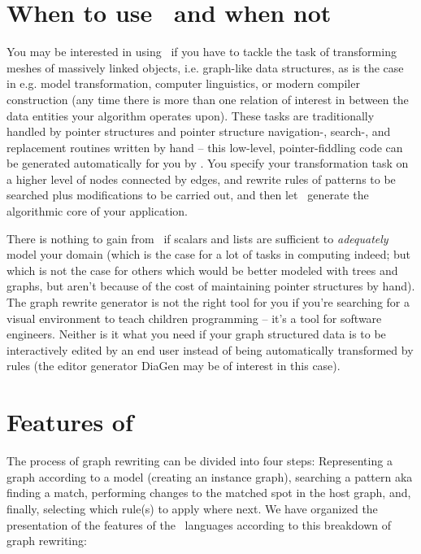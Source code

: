 \section{When to use \GrG~and when not}
You may be interested in using \GrG\ if you have to tackle the task of transforming meshes of massively linked objects, i.e. graph-like data structures,
as is the case in e.g. model transformation, computer linguistics, or modern compiler construction 
(any time there is more than one relation of interest in between the data entities your algorithm operates upon).
These tasks are traditionally handled by pointer structures and pointer structure navigation-, search-, and replacement routines written by hand
-- this low-level, pointer-fiddling code can be generated automatically for you by \GrG.
You specify your transformation task on a higher level of nodes connected by edges, and rewrite rules of patterns to be searched plus modifications to be carried out,
and then let \GrG\ generate the algorithmic core of your application.

There is nothing to gain from \GrG\ if scalars and lists are sufficient to \emph{adequately} model your domain 
(which is the case for a lot of tasks in computing indeed; 
but which is not the case for others which would be better modeled with trees and graphs, but aren't because of the cost of maintaining pointer structures by hand).
The graph rewrite generator is not the right tool for you if you're searching for a visual environment to teach children programming -- it's a tool for software engineers.
Neither is it what you need if your graph structured data is to be interactively edited by an end user instead of being automatically transformed by rules (the editor generator DiaGen\cite{diagen} may be of interest in this case).


\section{Features of \GrG}

The process of graph rewriting can be divided into four steps:
Representing a graph according to a model (creating an instance graph), 
searching a pattern aka finding a match, 
performing changes to the matched spot in the host graph, 
and, finally, selecting which rule(s) to apply where next.
We have organized the presentation of the features of the \GrG\ languages according to this breakdown of graph rewriting:

